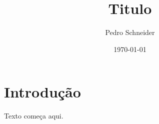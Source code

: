 \documentclass{article}
\title{Titulo}
\author{Pedro Schneider}
\date{\today}
\begin{document}
\maketitle

\section{Introdução}

Texto começa aqui.

%
%
\end{document}
